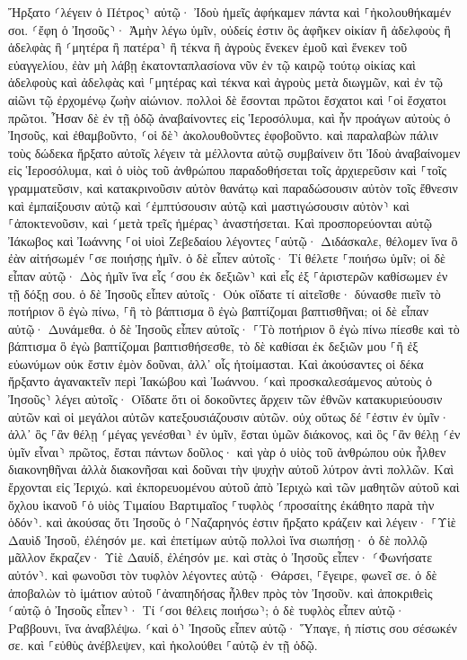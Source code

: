 \documentclass[twoside, 9pt]{extreport}
\begin{document}
Ἤρξατο ⸂λέγειν ὁ Πέτρος⸃ αὐτῷ· Ἰδοὺ ἡμεῖς ἀφήκαμεν πάντα καὶ ⸀ἠκολουθήκαμέν σοι. 
⸂ἔφη ὁ Ἰησοῦς⸃· Ἀμὴν λέγω ὑμῖν, οὐδείς ἐστιν ὃς ἀφῆκεν οἰκίαν ἢ ἀδελφοὺς ἢ ἀδελφὰς ἢ ⸂μητέρα ἢ πατέρα⸃ ἢ τέκνα ἢ ἀγροὺς ἕνεκεν ἐμοῦ καὶ ἕνεκεν τοῦ εὐαγγελίου, 
ἐὰν μὴ λάβῃ ἑκατονταπλασίονα νῦν ἐν τῷ καιρῷ τούτῳ οἰκίας καὶ ἀδελφοὺς καὶ ἀδελφὰς καὶ ⸀μητέρας καὶ τέκνα καὶ ἀγροὺς μετὰ διωγμῶν, καὶ ἐν τῷ αἰῶνι τῷ ἐρχομένῳ ζωὴν αἰώνιον. 
πολλοὶ δὲ ἔσονται πρῶτοι ἔσχατοι καὶ ⸀οἱ ἔσχατοι πρῶτοι. 
Ἦσαν δὲ ἐν τῇ ὁδῷ ἀναβαίνοντες εἰς Ἱεροσόλυμα, καὶ ἦν προάγων αὐτοὺς ὁ Ἰησοῦς, καὶ ἐθαμβοῦντο, ⸂οἱ δὲ⸃ ἀκολουθοῦντες ἐφοβοῦντο. καὶ παραλαβὼν πάλιν τοὺς δώδεκα ἤρξατο αὐτοῖς λέγειν τὰ μέλλοντα αὐτῷ συμβαίνειν 
ὅτι Ἰδοὺ ἀναβαίνομεν εἰς Ἱεροσόλυμα, καὶ ὁ υἱὸς τοῦ ἀνθρώπου παραδοθήσεται τοῖς ἀρχιερεῦσιν καὶ ⸀τοῖς γραμματεῦσιν, καὶ κατακρινοῦσιν αὐτὸν θανάτῳ καὶ παραδώσουσιν αὐτὸν τοῖς ἔθνεσιν 
καὶ ἐμπαίξουσιν αὐτῷ καὶ ⸂ἐμπτύσουσιν αὐτῷ καὶ μαστιγώσουσιν αὐτὸν⸃ καὶ ⸀ἀποκτενοῦσιν, καὶ ⸂μετὰ τρεῖς ἡμέρας⸃ ἀναστήσεται. 
Καὶ προσπορεύονται αὐτῷ Ἰάκωβος καὶ Ἰωάννης ⸀οἱ υἱοὶ Ζεβεδαίου λέγοντες ⸀αὐτῷ· Διδάσκαλε, θέλομεν ἵνα ὃ ἐὰν αἰτήσωμέν ⸀σε ποιήσῃς ἡμῖν. 
ὁ δὲ εἶπεν αὐτοῖς· Τί θέλετε ⸀ποιήσω ὑμῖν; 
οἱ δὲ εἶπαν αὐτῷ· Δὸς ἡμῖν ἵνα εἷς ⸂σου ἐκ δεξιῶν⸃ καὶ εἷς ἐξ ⸀ἀριστερῶν καθίσωμεν ἐν τῇ δόξῃ σου. 
ὁ δὲ Ἰησοῦς εἶπεν αὐτοῖς· Οὐκ οἴδατε τί αἰτεῖσθε· δύνασθε πιεῖν τὸ ποτήριον ὃ ἐγὼ πίνω, ⸀ἢ τὸ βάπτισμα ὃ ἐγὼ βαπτίζομαι βαπτισθῆναι; 
οἱ δὲ εἶπαν αὐτῷ· Δυνάμεθα. ὁ δὲ Ἰησοῦς εἶπεν αὐτοῖς· ⸀Τὸ ποτήριον ὃ ἐγὼ πίνω πίεσθε καὶ τὸ βάπτισμα ὃ ἐγὼ βαπτίζομαι βαπτισθήσεσθε, 
τὸ δὲ καθίσαι ἐκ δεξιῶν μου ⸀ἢ ἐξ εὐωνύμων οὐκ ἔστιν ἐμὸν δοῦναι, ἀλλ᾽ οἷς ἡτοίμασται. 
Καὶ ἀκούσαντες οἱ δέκα ἤρξαντο ἀγανακτεῖν περὶ Ἰακώβου καὶ Ἰωάννου. 
⸂καὶ προσκαλεσάμενος αὐτοὺς ὁ Ἰησοῦς⸃ λέγει αὐτοῖς· Οἴδατε ὅτι οἱ δοκοῦντες ἄρχειν τῶν ἐθνῶν κατακυριεύουσιν αὐτῶν καὶ οἱ μεγάλοι αὐτῶν κατεξουσιάζουσιν αὐτῶν. 
οὐχ οὕτως δέ ⸀ἐστιν ἐν ὑμῖν· ἀλλ᾽ ὃς ⸀ἂν θέλῃ ⸂μέγας γενέσθαι⸃ ἐν ὑμῖν, ἔσται ὑμῶν διάκονος, 
καὶ ὃς ⸀ἂν θέλῃ ⸂ἐν ὑμῖν εἶναι⸃ πρῶτος, ἔσται πάντων δοῦλος· 
καὶ γὰρ ὁ υἱὸς τοῦ ἀνθρώπου οὐκ ἦλθεν διακονηθῆναι ἀλλὰ διακονῆσαι καὶ δοῦναι τὴν ψυχὴν αὐτοῦ λύτρον ἀντὶ πολλῶν. 
Καὶ ἔρχονται εἰς Ἰεριχώ. καὶ ἐκπορευομένου αὐτοῦ ἀπὸ Ἰεριχὼ καὶ τῶν μαθητῶν αὐτοῦ καὶ ὄχλου ἱκανοῦ ⸀ὁ υἱὸς Τιμαίου Βαρτιμαῖος ⸀τυφλὸς ⸂προσαίτης ἐκάθητο παρὰ τὴν ὁδόν⸃. 
καὶ ἀκούσας ὅτι Ἰησοῦς ὁ ⸀Ναζαρηνός ἐστιν ἤρξατο κράζειν καὶ λέγειν· ⸀Υἱὲ Δαυὶδ Ἰησοῦ, ἐλέησόν με. 
καὶ ἐπετίμων αὐτῷ πολλοὶ ἵνα σιωπήσῃ· ὁ δὲ πολλῷ μᾶλλον ἔκραζεν· Υἱὲ Δαυίδ, ἐλέησόν με. 
καὶ στὰς ὁ Ἰησοῦς εἶπεν· ⸂Φωνήσατε αὐτόν⸃. καὶ φωνοῦσι τὸν τυφλὸν λέγοντες αὐτῷ· Θάρσει, ⸀ἔγειρε, φωνεῖ σε. 
ὁ δὲ ἀποβαλὼν τὸ ἱμάτιον αὐτοῦ ⸀ἀναπηδήσας ἦλθεν πρὸς τὸν Ἰησοῦν. 
καὶ ἀποκριθεὶς ⸂αὐτῷ ὁ Ἰησοῦς εἶπεν⸃· Τί ⸂σοι θέλεις ποιήσω⸃; ὁ δὲ τυφλὸς εἶπεν αὐτῷ· Ραββουνι, ἵνα ἀναβλέψω. 
⸂καὶ ὁ⸃ Ἰησοῦς εἶπεν αὐτῷ· Ὕπαγε, ἡ πίστις σου σέσωκέν σε. καὶ ⸀εὐθὺς ἀνέβλεψεν, καὶ ἠκολούθει ⸀αὐτῷ ἐν τῇ ὁδῷ. 
\end{document}
